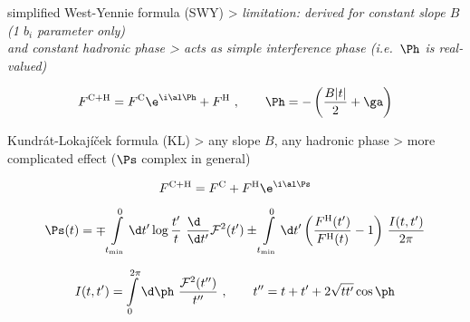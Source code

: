 \newpage %

\> {simplified West-Yennie formula} (SWY)
\>> \em{limitation}: derived for \em{constant slope $B$} (1 $b_i$ parameter only)\\ and \em{constant hadronic phase}
\>> acts as simple {interference phase} (i.e.~$\Ph$ is real-valued)

$$F^{\rm C+H} = F^{\rm C} \e^{\i \al \Ph} + F^{\rm H}\ ,\qquad \Ph = - \left( {B |t|\over 2} + \ga \right)$$

\> {Kundrát-Lokajíček formula} (KL)
\>> any slope $B$, any hadronic phase
\>> more complicated effect ($\Ps$ complex in general)

$$F^{\rm C+H} = F^{\rm C} + F^{\rm H} \e^{\i \al \Ps}$$

$$\Ps(t) =
	\mp \int\limits_{t_{\rm min}}^{0} \d t' \log {t'\over t}\ {\d\phantom{t'}\over\d t'} {\cal F}^2(t')
	\pm \int\limits_{t_{\rm min}}^{0} \d t' \left ( {F^{\rm H}(t')\over F^{\rm H}(t)} - 1 \right)\, {I(t, t')\over 2\pi}
$$

$$I(t, t') = \int\limits_{0}^{2\pi}\d\ph\ {{\cal F}^2(t'')\over t''}\ ,\qquad t'' = t + t' + 2\sqrt{t t'} \cos\ph$$


\newpage %

\hbox{}\vfil

\centerline{%
	\hskip5mm
}


\vfil
\eject
\bye

